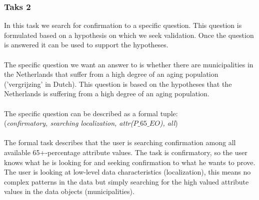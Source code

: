 \subsubsection{Taks 2}
In this task we search for confirmation to a specific question.
This question is formulated based on a hypothesis on which we seek validation.
Once the question is answered it can be used to support the hypotheses.\\
\\
The specific question we want an answer to is whether there are municipalities in the Netherlands that suffer from a high degree of an aging population ('vergrijzing' in Dutch).
This question is based on the hypotheses that the Netherlands is suffering from a high degree of an aging population.\\
\\
The specific question can be described as a formal tuple:\\
(\textit{confirmatory, searching localization, attr($P\_65\_EO$), all})\\
\\
The formal task describes that the user is searching confirmation among all available 65+-percentage attribute values.
The task is confirmatory, so the user knows what he is looking for and seeking confirmation to what he wants to prove.
The user is looking at low-level data characteristics (localization), this means no complex patterns in the data but simply searching for the high valued attribute values in the data objects (municipalities).

